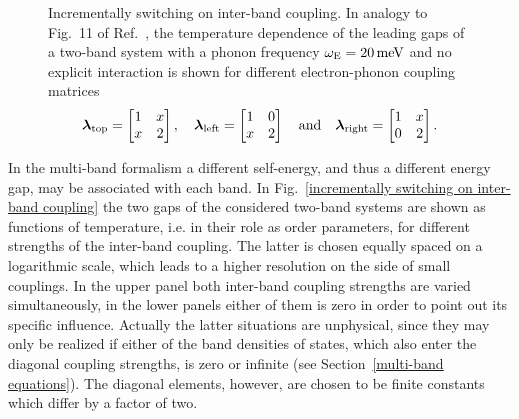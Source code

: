 \begin{figure}
    \small
    
    
    
    \captionsetup{singlelinecheck=off}
    \caption[Incrementally switching on inter-band coupling]{
        Incrementally switching on inter-band coupling. In analogy to Fig.~11 of
        Ref.~, the temperature dependence of the
        leading  gaps of a two-band system with a phonon
        frequency $\omega \sb{\text{E}} = 20 \, \mathrm{meV}$ and no explicit
         interaction is shown for different electron-phonon
        coupling matrices
        \begin{equation*}
            \boldsymbol \lambda \sb{\text{top}} =
            \begin{bmatrix}
                1 & x \\
                x & 2
            \end{bmatrix},
            \quad
            \boldsymbol \lambda \sb{\text{left}} =
            \begin{bmatrix}
                1 & 0 \\
                x & 2
            \end{bmatrix}
            \quad \text{and} \quad
            \boldsymbol \lambda \sb{\text{right}} =
            \begin{bmatrix}
                1 & x \\
                0 & 2
            \end{bmatrix}.
        \end{equation*}
        }
    \label{incrementally switching on inter-band coupling}
\end{figure}
%
In the multi-band formalism a different self-energy, and thus a different energy
gap, may be associated with each band. In Fig.~\ref{incrementally switching on
inter-band coupling} the two gaps of the considered two-band systems are shown
as functions of temperature, i.e. in their role as order parameters, for
different strengths of the inter-band coupling. The latter is chosen equally
spaced on a logarithmic scale, which leads to a higher resolution on the side of
small couplings. In the upper panel both inter-band coupling strengths are
varied simultaneously, in the lower panels either of them is zero in order to
point out its specific influence. Actually the latter situations are unphysical,
since they may only be realized if either of the band densities of states, which
also enter the diagonal coupling strengths, is zero or infinite (see
Section~\ref{multi-band equations}). The diagonal elements, however, are chosen
to be finite constants which differ by a factor of two.

